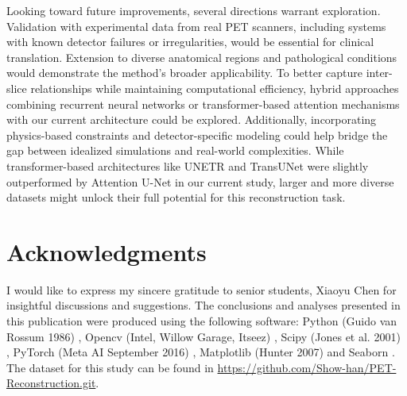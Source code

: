 \documentclass[aps,prb,preprint,groupedaddress,showkeys]{revtex4}
\begin{document}
Looking toward future improvements, several directions warrant exploration. Validation with experimental data from real PET scanners, including systems with known detector failures or irregularities, would be essential for clinical translation. Extension to diverse anatomical regions and pathological conditions would demonstrate the method's broader applicability.
To better capture inter-slice relationships while maintaining computational efficiency, hybrid approaches combining recurrent neural networks or transformer-based attention mechanisms with our current architecture could be explored. Additionally, incorporating physics-based constraints and detector-specific modeling could help bridge the gap between idealized simulations and real-world complexities. While transformer-based architectures like UNETR and TransUNet were slightly outperformed by Attention U-Net in our current study, larger and more diverse datasets might unlock their full potential for this reconstruction task.



\section{Acknowledgments}
I would like to express my sincere gratitude to senior students, Xiaoyu Chen for insightful discussions and suggestions.
The conclusions and analyses presented in this publication were produced using the following software: Python (Guido van Rossum 1986) \cite{10.5555/1593511}, Opencv (Intel, Willow Garage, Itseez) \cite{itseez2015opencv}, Scipy (Jones et al. 2001) \cite{2020SciPy-NMeth}, PyTorch  (Meta AI September 2016) \cite{NEURIPS2019_9015}, Matplotlib (Hunter 2007) \cite{Hunter:2007} and Seaborn \cite{Waskom2021}.
The dataset for this study can be found in \url{https://github.com/Show-han/PET-Reconstruction.git}.


\end{document}
